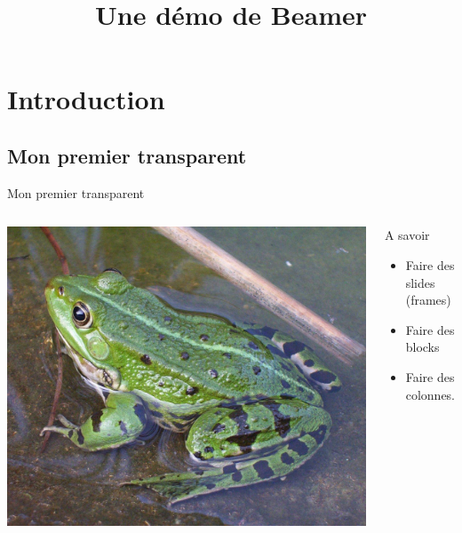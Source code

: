 \documentclass[a4paper, dvipsnames]{beamer}
\title{Une démo de Beamer}
\begin{document}
\section{Introduction}

\begin{frame}
	\titlepage
\end{frame}    

\subsection{Mon premier transparent}
\begin{frame}{Mon premier transparent}
	\begin{columns}[c]
		\includegraphics[width =\textwidth]{figures/frog.jpg}
		\begin{block}{A savoir}
			\begin{itemize}
				\item Faire des slides (frames)
				\item Faire des blocks
				\item Faire des colonnes.
			\end{itemize}
		\end{block}
	\end{columns}
\end{frame} 
\end{document}
